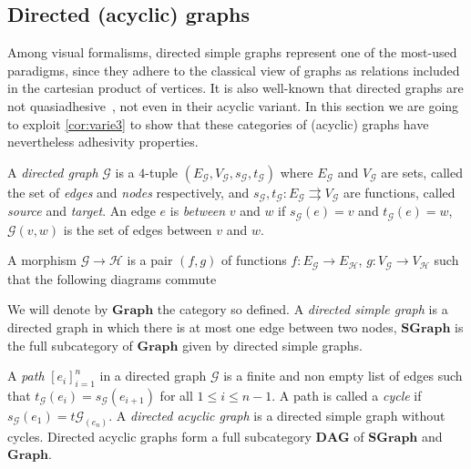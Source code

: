 \documentclass[runningheads,envcountsect]{lmcs}
\newcommand{\gr}{\catname{Graph}}
\newcommand{\dgr}{\catname{SGraph}}
\newcommand{\dg}{\catname{DAG}}
\newcommand{\catname}[1]{\mathbf{#1}}
\theoremstyle{plain}
\theoremstyle{definition}
\begin{document}
\subsection{Directed (acyclic) graphs}
Among visual formalisms, directed simple graphs represent one of the most-used paradigms,
since they adhere to the classical view of graphs as relations included in the cartesian product of vertices.
%
It is also well-known that directed graphs are not quasiadhesive~\cite{johnstone2007quasitoposes}, not even in their acyclic variant. In this section we are going to exploit \cref{cor:varie3} to show that these categories of (acyclic) graphs have nevertheless adhesivity properties.


\begin{defi}
	A \emph{directed graph} $\mathcal{{G}}$ is a  $4$-tuple $(E_\mathcal{{G}}, V_\mathcal{{G}}, s_\mathcal{{G}}, t_\mathcal{{G}})$ where $E_\mathcal{{G}}$ and $V_\mathcal{{G}}$ are sets, called the set of \emph{edges} and \emph{nodes} respectively, and $s_\mathcal{{G}},t_\mathcal{{G}}:E_\mathcal{{G}}\rightrightarrows V_\mathcal{{G}}$ are functions, called \emph{source} and \emph{target}. An edge $e$ is \emph{between} $v$ and $w$ if $s_\mathcal{{G}}(e)=v$ and $t_\mathcal{{G}}(e)=w$, $\mathcal{{G}}(v,w)$ is the set of edges between $v$ and $w$. 
	
	A morphism $\mathcal{{G}}\rightarrow \mathcal{{H}}$ is a pair $(f,g)$ of functions $f:E_\mathcal{{G}}\rightarrow E_\mathcal{H}$, $g:V_\mathcal{{G}}\rightarrow V_\mathcal{H}$ such that the following diagrams commute
	\begin{center}
	\end{center}	
	We will denote by $\gr$ the category so defined.  A \emph{directed simple graph} is a directed graph in which there is at most one edge between two nodes, $\dgr$ is the full subcategory of $\gr$ given by directed simple graphs.
	
		A \emph{path} $[e_i]_{i=1}^n$ in a directed graph $\mathcal{{G}}$ is a finite and non empty list of edges such that $t_\mathcal{{G}}(e_{i})=s_\mathcal{{G}}(e_{i+1})$ for all $1\leq i\leq {n-1}$. A path is called a \emph{cycle} if $s_\mathcal{{G}}(e_1)=t\mathcal{{G}}_(e_n)$. A \emph{directed acyclic graph} is a directed simple graph without cycles. Directed acyclic graphs form a full subcategory $\dg$ of $\dgr$ and $\gr$.
\end{defi}
\end{document}
